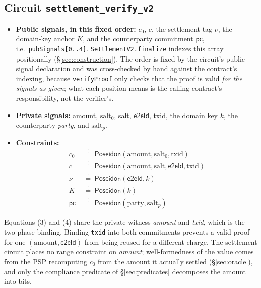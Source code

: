 \documentclass[11pt]{article}
\newcommand{\Poseidon}{\ensuremath{\mathsf{Poseidon}}}
\newcommand{\eeid}{\ensuremath{\mathsf{e2eId}}}
\newcommand{\code}[1]{\texttt{#1}}
\begin{document}
\subsection{Circuit \code{settlement\_verify\_v2}}
\begin{itemize}
\item \textbf{Public signals, in this fixed order:} $c_0$, $c$, the settlement
tag $\nu$, the domain-key anchor $K$, and the counterparty commitment
$\mathsf{pc}$, i.e.\ \code{pubSignals[0..4]}. \code{SettlementV2.finalize}
indexes this array positionally (\S\ref{sec:construction}). The order is fixed
by the circuit's public-signal declaration and was cross-checked by hand
against the contract's indexing, because \code{verifyProof} only checks that the
proof is valid \emph{for the signals as given}; what each position means is the
calling contract's responsibility, not the verifier's.
\item \textbf{Private signals:} amount, $\text{salt}_0$, salt, \eeid, txid, the
domain key $k$, the counterparty \emph{party}, and $\text{salt}_p$.
\item \textbf{Constraints:}
\begin{align}
c_0 &\;\overset{!}{=}\; \Poseidon(\text{amount}, \text{salt}_0, \text{txid}) \\
c   &\;\overset{!}{=}\; \Poseidon(\text{amount}, \text{salt}, \eeid, \text{txid}) \\
\nu &\;\overset{!}{=}\; \Poseidon(\eeid, k) \\
K   &\;\overset{!}{=}\; \Poseidon(k) \\
\mathsf{pc} &\;\overset{!}{=}\; \Poseidon(\text{party}, \text{salt}_p)
\end{align}
\end{itemize}
Equations (3) and (4) share the private witness \emph{amount} and \emph{txid},
which is the two-phase binding. Binding \code{txid} into both commitments
prevents a valid proof for one $(\text{amount}, \eeid)$ from being reused for a
different charge. The settlement circuit places no range constraint on
\emph{amount}; well-formedness of the value comes from the PSP recomputing $c_0$
from the amount it actually settled (\S\ref{sec:oracle}), and only the
compliance predicate of \S\ref{sec:predicates} decomposes the amount into bits.
\end{document}

